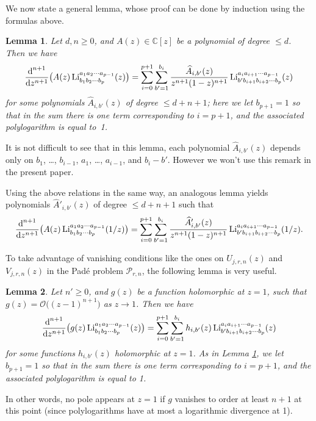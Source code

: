 \documentclass[reqno,12pt]{amsart}
\numberwithin{equation}{section}
\newtheorem{lem}{Lemma}
\theoremstyle{remark}
\def\li{\operatorname{Li}}
\def\dd{\textup{d}}
\newcommand{\gdo}{\mathcal{O}}
\newcommand{\Prn}{\mathcal{P}_{r,n}}
\begin{document}
We now state a general lemma, whose proof can be done by induction using the formulas above.

\begin{lem}  \label{lem:4} Let $d,n\geq 0$, and $A(z)\in \mathbb C[z]$ be a polynomial of degree $\le d$. Then 
we have
$$
\frac{\dd^{n+1}}{\dd z^{n+1}} \big(A(z) \li_{ b_1b_2\cdots b_p}^{  a_1a_2\cdots a_{p-1}}(z)\big) 
= \sum_{i=0}^{p+1} \sum_{b'=1}^{b_i}  \frac{\widehat{A}_{i,b'} (z)}{z^{n+1}(1-z)^{n+1}} 
\li_{b' b_{i+1}b_{i+2}\cdots b_p}^{  a_ia_{i+1}\cdots a_{p-1}}(z)
$$ 
for some polynomials $\widehat{A}_{i,b'} (z)$ of degree $\leq d+n+1$; here we let $b_{p+1}=1$ so that 
in the sum there is one term corresponding to $i=p+1$, and the associated polylogarithm is equal to~1. 
\end{lem}

It is not difficult to see that in this lemma,  each polynomial  $\widehat{A}_{i,b'} (z)$ depends 
only on $b_1$, \ldots, $b_{i-1}$, $a_1$, \ldots, $a_{i-1}$, and $b_i-b'$. However we won't use this 
remark in the present paper.

\medskip

Using the above relations in the same way, an analogous lemma yields polynomials $\widehat{A}'_{i,b'} (z)$ 
of degree $\leq d+n+1$ such that 
$$
\frac{\dd^{n+1}}{\dd z^{n+1}} \big(A(z) \li_{ b_1b_2\cdots b_p}^{  a_1a_2\cdots a_{p-1}}(1/z)\big) 
= \sum_{i=0}^{p+1} \sum_{b'=1}^{b_i}  \frac{\widehat{A}'_{i,b'} (z)}{z^{n+1}(1-z)^{n+1}} 
\li_{b' b_{i+1}b_{i+2}\cdots b_p}^{  a_ia_{i+1}\cdots a_{p-1}}(1/z).
$$ 

To take advantage of vanishing conditions like the ones on $U_{j,r,n}(z)$ and $V_{j,r,n}(z)$ 
in the Pad\'e problem $\Prn$, the following lemma is very useful.

\begin{lem}  \label{lemannulation} Let $n' \geq 0$, and $g(z)$ be a function holomorphic 
at $z=1$, such that $g(z) = \gdo \big((z-1)^{n+1}\big)$ as $z\to 1$. Then we have
$$
\frac{\dd^{n+1}}{\dd z^{n+1}} \big(g(z) \li_{ b_1b_2\cdots b_p}^{  a_1a_2\cdots a_{p-1}}(z)\big) 
= \sum_{i=0}^{p+1} \sum_{b'=1}^{b_i} h_{i,b'}(z)
\li_{b' b_{i+1}b_{i+2}\cdots b_p}^{  a_ia_{i+1}\cdots a_{p-1}}(z)
$$ 
for some functions $h_{i,b'} (z)$ holomorphic at $z=1$. As in Lemma \ref{lem:4},  we let $b_{p+1}=1$ so that 
in the sum there is one term corresponding to $i=p+1$, and the associated polylogarithm is equal to 1. 
\end{lem}

In other words, no pole appears at $z=1$ if $g$ vanishes to order at least $n+1$ at this 
point (since polylogarithms have at most a logarithmic divergence at 1).
\end{document}
